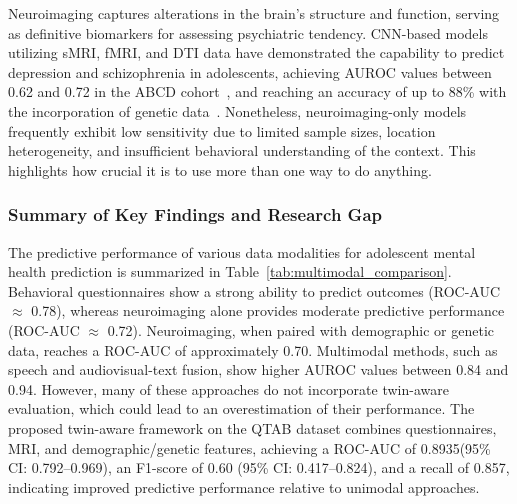 \documentclass[10pt,letterpaper]{article}
\begin{document}
        Neuroimaging captures alterations in the brain's structure and function, serving as definitive biomarkers for assessing psychiatric tendency. CNN-based models utilizing sMRI, fMRI, and DTI data have demonstrated the capability to predict depression and schizophrenia in adolescents, achieving AUROC values between 0.62 and 0.72 in the ABCD cohort~\cite{ref23}, and reaching an accuracy of up to 88\% with the incorporation of genetic data~\cite{ref25}. Nonetheless, neuroimaging-only models frequently exhibit low sensitivity due to limited sample sizes, location heterogeneity, and insufficient behavioral understanding of the context. This highlights how crucial it is to use more than one way to do anything.


        \subsubsection*{Summary of Key Findings and Research Gap}

        The predictive performance of various data modalities for adolescent mental health prediction is summarized in Table~\ref{tab:multimodal_comparison}. Behavioral questionnaires show a strong ability to predict outcomes (ROC-AUC $\approx$ 0.78), whereas neuroimaging alone provides moderate predictive performance (ROC-AUC $\approx$ 0.72). Neuroimaging, when paired with demographic or genetic data, reaches a ROC-AUC of approximately 0.70. Multimodal methods, such as speech and audiovisual-text fusion, show higher AUROC values between 0.84 and 0.94. However, many of these approaches do not incorporate twin-aware evaluation, which could lead to an overestimation of their performance. The proposed twin-aware framework on the QTAB dataset combines questionnaires, MRI, and demographic/genetic features, achieving a ROC-AUC of 0.8935(95\% CI: 0.792--0.969), an F1-score of 0.60 (95\% CI: 0.417--0.824), and a recall of 0.857, indicating improved predictive performance relative to unimodal approaches.
\end{document}
